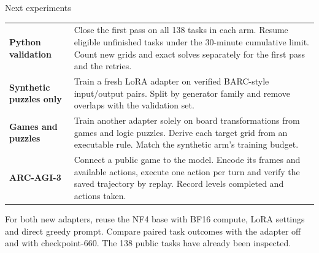 \begin{frame}[t]{Next experiments}
\med
\begin{tabular}{@{}>{\raggedright\arraybackslash\bfseries}p{40mm}>{\raggedright\arraybackslash}p{169mm}@{}}
Python validation & Close the first pass on all 138 tasks in each arm. Resume eligible unfinished tasks under the 30-minute cumulative limit. Count new grids and exact solves separately for the first pass and the retries.\\[3mm]
Synthetic puzzles only & Train a fresh LoRA adapter on verified BARC-style input/output pairs. Split by generator family and remove overlaps with the validation set.\\[3mm]
Games and puzzles & Train another adapter solely on board transformations from games and logic puzzles. Derive each target grid from an executable rule. Match the synthetic arm's training budget.\\[3mm]
ARC-AGI-3 & Connect a public game to the model. Encode its frames and available actions, execute one action per turn and verify the saved trajectory by replay. Record levels completed and actions taken.\\
\end{tabular}
\vfill
\smallbody For both new adapters, reuse the NF4 base with BF16 compute, LoRA settings and direct greedy prompt. Compare paired task outcomes with the adapter off and with checkpoint-660. The 138 public tasks have already been inspected.
\end{frame}
